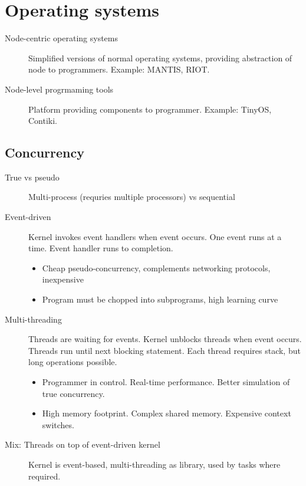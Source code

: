 \section{Operating systems}

\begin{description}
		\item[Node-centric operating systems] Simplified versions of normal
				operating systems, providing abstraction of node to
				programmers. Example: MANTIS, RIOT.
		\item[Node-level progrmaming tools] Platform providing components to
				programmer. Example: TinyOS, Contiki.
\end{description}

\subsection{Concurrency}

\begin{description}
		\item[True vs pseudo] Multi-process (requries multiple processors) vs
				sequential
		\item[Event-driven] Kernel invokes event handlers when
				event occurs. One event runs at a time. Event
				handler runs to completion.
				\begin{itemize}
						\item Cheap pseudo-concurrency, complements networking protocols, inexpensive
						\item Program must be chopped into subprograms, high learning curve
				\end{itemize}
		\item[Multi-threading] Threads are waiting for events.
				Kernel unblocks threads when event occurs.
				Threads run until next blocking statement. Each
				thread requires stack, but long operations
				possible.
				\begin{itemize}
						\item Programmer in control. Real-time performance.
								Better simulation of true concurrency.
						\item High memory footprint. Complex shared memory.
								Expensive context switches.
				\end{itemize}
		\item[Mix: Threads on top of event-driven kernel] Kernel is
				event-based, multi-threading as library, used by tasks where
				required.
\end{description}

